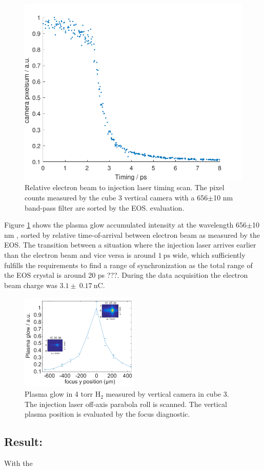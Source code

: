 \begin{figure}[htbp]
\includegraphics[width=1\textwidth]{experiment/images/raw/PlasmaGlow_20384_scatter.pdf}
\caption{Relative electron beam to injection laser timing scan. The pixel counts measured by the cube 3 vertical camera with a 656$\pm$10 nm  band-pass filter are sorted by the EOS. evaluation.}
\label{img:PlasmaGlowTimingOAP_H2He}
\end{figure}

Figure \ref{img:PlasmaGlowTimingOAP_H2He} shows the plasma glow accumulated intensity at the wavelength 656$\pm$10 nm , sorted by relative time-of-arrival between electron beam as measured by the EOS. The transition between a situation where the injection laser arrives earlier than the electron beam and vice versa is around $1\ \mathrm{ps}$ wide, which sufficiently fulfills the requirements to find a range of synchronization as the total range of the EOS crystal is around 20 ps ???.
During the data acquisition the electron beam charge was $3.1\pm \ 0.17\ \mathrm{nC}$. 

\begin{figure}[htbp]
\includegraphics[width=0.5\textwidth]{experiment/images/edited/Plasma_Glow_roll.pdf}
\caption{Plasma glow in 4 torr $\mathrm{H}_2$ measured by vertical camera in cube 3. The injection laser off-axis parabola roll is scanned. The vertical plasma position is evaluated by the focus diagnostic.}
\label{img:PlasmaGlowRoll}
\end{figure}



\subsection*{Result:}
With the 
